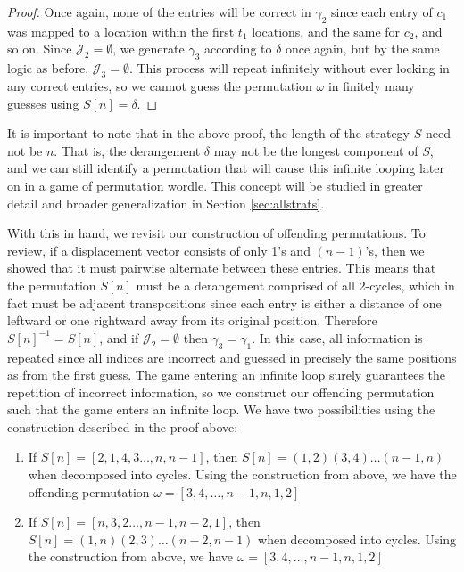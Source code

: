 \documentclass[article]{amsart}
\theoremstyle{plain}
\begin{document}
\begin{proof}
Once again, none of the entries will be correct in $\gamma_2$ since each entry of $c_1$ was mapped to a location within the first $t_1$ locations, and the same for $c_2$, and so on. Since $\mathcal{J}_2 = \emptyset$, we generate $\gamma_3$ according to $\delta$ once again, but by the same logic as before, $\mathcal{J}_3 = \emptyset$. This process will repeat infinitely without ever locking in any correct entries, so we cannot guess the permutation $\omega$ in finitely many guesses using $S[n] = \delta$. 
\end{proof}


It is important to note that in the above proof, the length of the strategy $S$ need not be $n$. That is, the derangement $\delta$ may not be the longest component of $S$, and we can still identify a permutation that will cause this infinite looping later on in a game of permutation wordle. This concept will be studied in greater detail and broader generalization in Section \ref{sec:allstrats}.


With this in hand, we revisit our construction of offending permutations. To review, if a displacement vector consists of only 1's and $(n-1)$'s, then we showed that it must pairwise alternate between these entries. This means that the permutation $S[n]$ must be a derangement comprised of all 2-cycles, which in fact must be adjacent transpositions since each entry is either a distance of one leftward or one rightward away from its original position. Therefore $S[n]^{-1} = S[n]$, and if $\mathcal{J}_2 = \emptyset$ then $\gamma_3 = \gamma_1$. In this case, all information is repeated since all indices are incorrect and guessed in precisely the same positions as from the first guess. The game entering an infinite loop surely guarantees the repetition of incorrect information, so we construct our offending permutation such that the game enters an infinite loop. We have two possibilities using the construction described in the proof above:

\begin{algorithm}
\caption{Offending Permutation Constructor For $D \subset \{1,n-1\}^n$} \label{alg:1&n-1}
\begin{enumerate}
    \item If $S[n] = [2,1,4,3\dots, n,n-1]$, then $S[n] = (1,2)(3,4)\dots(n-1,n)$ when decomposed into cycles. Using the construction from above, we have the offending permutation $\omega = [3,4,\dots, n-1,n,1,2]$
    \item If $S[n] = [n,3,2\dots,n-1,n-2,1]$, then $S[n] = (1,n)(2,3)\dots(n-2,n-1)$ when decomposed into cycles. Using the construction from above, we have $\omega = [3,4,\dots, n-1,n,1,2]$
\end{enumerate}
\end{algorithm}
\end{document}
